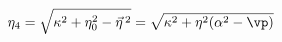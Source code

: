 \begin{equation}\label{25}
 \eta_4 = \sqrt{\kappa^2 +\eta_0^2 - \vec{\eta}\,{}^2} = \sqrt{\kappa^2 +\eta^2(\alpha^2 - \vp)}
\end{equation}

